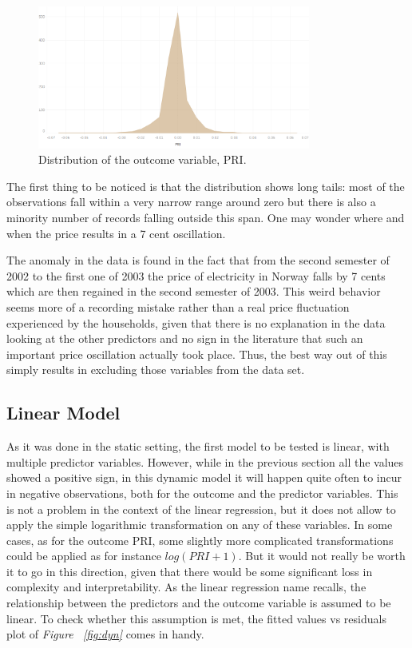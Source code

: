 \documentclass[a4paper,12pt]{book}
\begin{document}
\begin{figure}[tb]
\begin{center}
\captionsetup{justification=centering}
\includegraphics[width=0.8\textwidth]{Images/prihi.png}
\caption{Distribution of the outcome variable, PRI.}
\label{fig:pri}
\end{center}
\end{figure}

The first thing to be noticed is that the distribution shows long tails: most of the observations fall within a very narrow range around zero but there is also a minority number of records falling outside this span. One may wonder where and when the price results in a 7 cent oscillation.

The anomaly in the data is found in the fact that from the second semester of 2002 to the first one of 2003 the price of electricity in Norway falls by 7 cents which are then regained in the second semester of 2003. This weird behavior seems more of a recording mistake rather than a real price fluctuation experienced by the households, given that there is no explanation in the data looking at the other predictors and no sign in the literature that such an important price oscillation actually took place. Thus, the best way out of this simply results in excluding those variables from the data set.

\subsection{Linear Model}

As it was done in the static setting, the first model to be tested is linear, with multiple predictor variables. However, while in the previous section all the values showed a positive sign, in this dynamic model it will happen quite often to incur in negative observations, both for the outcome and the predictor variables. This is not a problem in the context of the linear regression, but it does not allow to apply the  simple logarithmic transformation on any of these variables. In some cases, as for the outcome PRI, some slightly more complicated transformations could be applied as for instance $log(PRI+1)$. But it would not really be worth it to go in this direction, given that there would be some significant loss in complexity and interpretability. As the linear regression name recalls, the relationship between the predictors and the outcome variable is assumed to be linear. To check whether this assumption is met, the fitted values vs residuals plot of \textit{Figure ~\ref{fig:dyn}} comes in handy.
\end{document}
